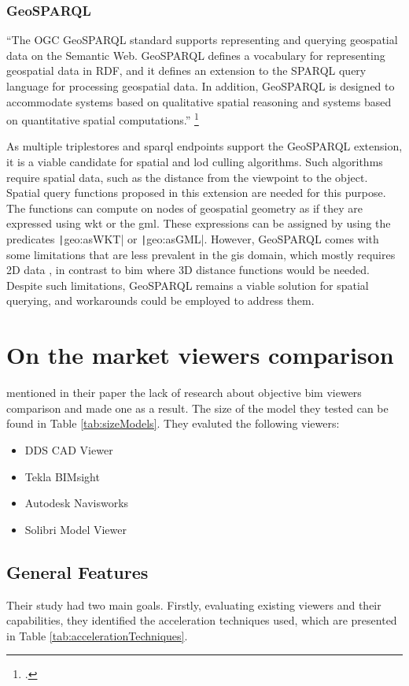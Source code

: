 \subsubsection{GeoSPARQL}
\enquote{The OGC GeoSPARQL standard supports representing and querying geospatial data on the Semantic Web. GeoSPARQL defines a vocabulary for representing geospatial data in RDF, and it defines an extension to the SPARQL query language for processing geospatial data. In addition, GeoSPARQL is designed to accommodate systems based on qualitative spatial reasoning and systems based on quantitative spatial computations.} \footcite{OGC2023}

As multiple triplestores and \ac{sparql} endpoints support the GeoSPARQL extension, it is a viable candidate for spatial and \ac{lod} culling algorithms. Such algorithms require spatial data, such as the distance from the viewpoint to the object. Spatial query functions proposed in this extension are needed for this purpose. The functions can compute on nodes of geospatial geometry as if they are expressed using \ac{wkt} or the \ac{gml}. These expressions can be assigned by using the predicates \texttt|geo:asWKT| or \texttt|geo:asGML|. However, GeoSPARQL comes with some limitations that are less prevalent in the \ac{gis} domain, which mostly requires 2D data \parencite{perry2012ogc}, in contrast to \ac{bim} where 3D distance functions would be needed. Despite such limitations, GeoSPARQL remains a viable solution for spatial querying, and workarounds could be employed to address them.

\section{On the market viewers comparison}
\cite{Johansson2015} mentioned in their paper the lack of research about objective \ac{bim} viewers comparison and made one as a result. The size of the model they tested can be found in Table \ref{tab:sizeModels}. They evaluted the following viewers:
\begin{itemize}
    \item DDS CAD Viewer
    \item Tekla BIMsight
    \item Autodesk Navisworks
    \item Solibri Model Viewer
\end{itemize}

\subsection{General Features}
Their study had two main goals. Firstly, evaluating existing viewers and their capabilities, they identified the acceleration techniques used, which are presented in Table \ref{tab:accelerationTechniques}.

